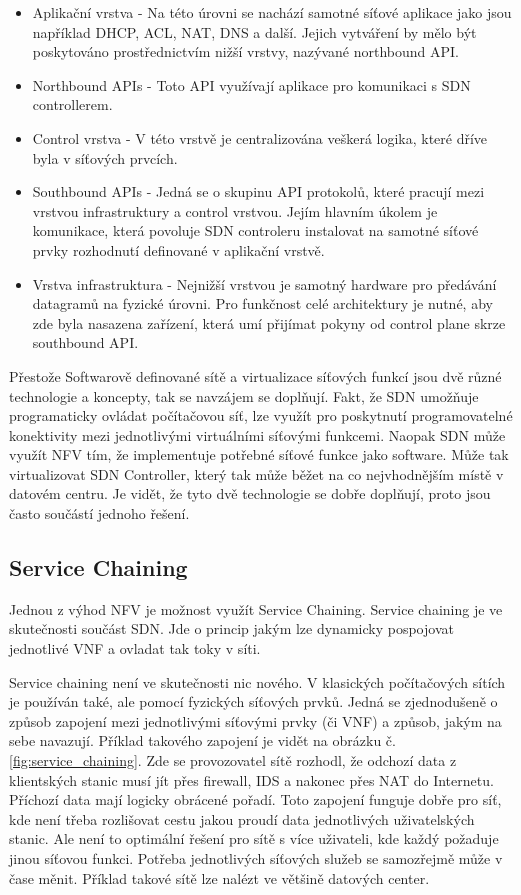 \begin{itemize}
\item Aplikační vrstva - Na této úrovni se nachází samotné síťové aplikace jako jsou například DHCP, ACL, NAT, DNS a další. Jejich vytváření by
mělo být poskytováno prostřednictvím nižší vrstvy, nazývané northbound API.
\item Northbound APIs - Toto API využívají aplikace pro komunikaci s SDN controllerem. 
\item Control vrstva - V této vrstvě je centralizována veškerá logika, které dříve byla v síťových prvcích.
\item Southbound APIs - Jedná se o skupinu API protokolů, které pracují mezi vrstvou infrastruktury a control vrstvou. Jejím hlavním úkolem je komunikace, která povoluje SDN controleru instalovat na samotné síťové prvky rozhodnutí definované v aplikační vrstvě.
\item Vrstva infrastruktura - Nejnižší vrstvou je samotný hardware pro předávání datagramů na fyzické úrovni. Pro funkčnost celé architektury je nutné, aby zde byla nasazena zařízení, která umí přijímat pokyny od control plane skrze southbound API.

\end{itemize}


Přestože Softwarově definované sítě a virtualizace síťových funkcí jsou dvě různé technologie a koncepty, tak se navzájem se doplňují. Fakt, že SDN umožňuje programaticky ovládat počítačovou síť, lze využít pro poskytnutí programovatelné konektivity mezi jednotlivými virtuálními síťovými funkcemi. Naopak SDN může využít NFV tím, že implementuje potřebné síťové funkce jako software. Může tak virtualizovat SDN Controller, který tak může běžet na co nejvhodnějším místě v datovém centru. Je vidět, že tyto dvě technologie se dobře doplňují, proto jsou často součástí jednoho řešení. \cite{SDN_book}


\subsection{Service Chaining}

Jednou z výhod NFV je možnost využít Service Chaining. Service chaining je ve skutečnosti součást SDN. Jde o princip jakým lze dynamicky pospojovat jednotlivé VNF a ovladat tak toky v síti. \cite{SDN_book}

Service chaining není ve skutečnosti nic nového. V klasických počítačových sítích je používán také, ale pomocí fyzických síťových prvků. Jedná se zjednodušeně o způsob zapojení mezi jednotlivými síťovými prvky (či VNF) a způsob, jakým na sebe navazují. Příklad takového zapojení je vidět na obrázku č. \ref{fig:service_chaining}. Zde se provozovatel sítě rozhodl, že odchozí data z klientských stanic musí jít přes firewall, IDS a nakonec přes NAT do Internetu. Příchozí data mají logicky obrácené pořadí. Toto zapojení funguje dobře pro síť, kde není třeba rozlišovat cestu jakou proudí data jednotlivých uživatelských stanic. Ale není to optimální řešení pro sítě s více uživateli, kde každý požaduje jinou síťovou funkci. Potřeba jednotlivých síťových služeb se samozřejmě může v čase měnit. Příklad takové sítě lze nalézt ve většině datových center. 

